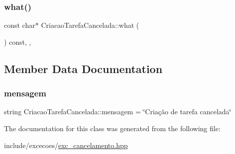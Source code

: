 \subsubsection{\texorpdfstring{what()}{what()}}
{\footnotesize\ttfamily const char$\ast$ Criacao\+Tarefa\+Cancelada\+::what (\begin{DoxyParamCaption}{ }\end{DoxyParamCaption}) const\hspace{0.3cm}{\ttfamily [inline]}, {\ttfamily [override]}, {\ttfamily [noexcept]}}



\subsection{Member Data Documentation}
\mbox{\label{classCriacaoTarefaCancelada_a8c861f898009f0691f033ecf83f4351f}} 
\subsubsection{\texorpdfstring{mensagem}{mensagem}}
{\footnotesize\ttfamily string Criacao\+Tarefa\+Cancelada\+::mensagem = \char`\"{}Criação de tarefa cancelada\char`\"{}\hspace{0.3cm}{\ttfamily [private]}}



The documentation for this class was generated from the following file\+:\begin{DoxyCompactItemize}
\item 
include/excecoes/\hyperlink{exc__cancelamento_8hpp}{exc\+\_\+cancelamento.\+hpp}\end{DoxyCompactItemize}
